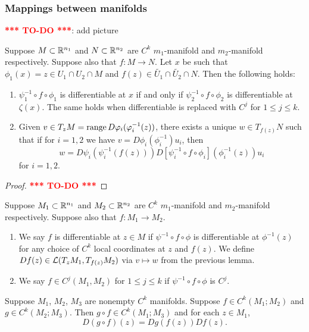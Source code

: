 \documentclass[a4paper]{article}
\newcommand{\TODO}{\textcolor{red}{\textbf{*** TO-DO ***}}}
\begin{document}
\subsubsection{Mappings between manifolds}

\TODO: add picture

\begin{lemma}
Suppose $M \subset \mathbb{R}^{n_1}$ and $N \subset \mathbb{R}^{n_2}$ are
$C^k$ $m_1$-manifold and $m_2$-manifold respectively.
Suppose also that $f : M \to N$.
Let $x$ be such that $\phi_1(x) = z \in U_1 \cap U_2 \cap M$
and $f(z) \in \tilde{U_1} \cap \tilde{U_2} \cap N$.
Then the following holds:
\begin{enumerate}
\item $\psi_1^{-1} \circ f \circ \phi_1$ is differentiable
at $x$ if and only if $\psi_2^{-1} \circ f \circ \phi_2$
is differentiable at $\zeta(x)$.
The same holds when differentiable is replaced with
$C^j$ for $1 \leq j \leq k$.

\item Given $v \in T_z M = \operatorname{range} D \varphi_i (\varphi_i^{-1}(z))$,
there exists a unique $w \in T_{f(z)} N$ such that if
for $i = 1, 2$ we have
$v = D \phi_i (\phi_i^{-1}) u_i$, then
\[
w = D \psi_i (\psi_i^{-1} (f(z)))
D [\psi_i^{-1} \circ f \circ \phi_i] (\phi_i^{-1}(z)) u_i
\]
for $i = 1, 2$.
\end{enumerate}
\end{lemma}

\begin{proof}
\TODO
\end{proof}

\begin{defi}
Suppose $M_1 \subset \mathbb{R}^{n_1}$ and $M_2 \subset \mathbb{R}^{n_2}$ are
$C^k$ $m_1$-manifold and $m_2$-manifold respectively.
Suppose also that $f : M_1 \to M_2$.

\begin{enumerate}
\item We say $f$ is differentiable at $z \in M$
if $\psi^{-1} \circ f \circ \phi$ is differentiable
at $\phi^{-1}(z)$ for any choice of $C^k$ local coordinates
at $z$ and $f(z)$. We define
$Df(z) \in \mathcal{L}(T_z M_1, T_{f(z)} M_2)$ via $v \mapsto w$
from the previous lemma.

\item We say $f \in C^j (M_1, M_2)$ for $1 \leq j \leq k$
if $\psi^{-1} \circ f \circ \phi$ is $C^j$.
\end{enumerate}
\end{defi}

\begin{thm}
Suppose $M_1$, $M_2$, $M_3$ are nonempty $C^k$ manifolds.
Suppose $f \in C^k(M_1; M_2)$ and $g \in C^k(M_2; M_3)$.
Then $g \circ f \in C^k (M_1; M_3)$ and for each $z \in M_1$,
\[
D (g \circ f)(z) = D g (f(z)) D f(z).
\]
\end{thm}
\end{document}
